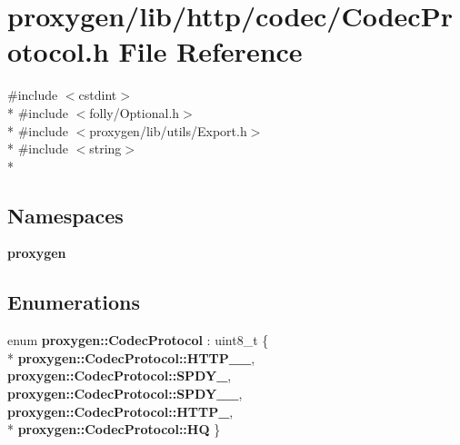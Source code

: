 \section{proxygen/lib/http/codec/\+Codec\+Protocol.h File Reference}
\label{CodecProtocol_8h}
{\ttfamily \#include $<$cstdint$>$}\\*
{\ttfamily \#include $<$folly/\+Optional.\+h$>$}\\*
{\ttfamily \#include $<$proxygen/lib/utils/\+Export.\+h$>$}\\*
{\ttfamily \#include $<$string$>$}\\*
\subsection*{Namespaces}
\begin{DoxyCompactItemize}
\item 
 {\bf proxygen}
\end{DoxyCompactItemize}
\subsection*{Enumerations}
\begin{DoxyCompactItemize}
\item 
enum {\bf proxygen\+::\+Codec\+Protocol} \+: uint8\+\_\+t \{ \\*
{\bf proxygen\+::\+Codec\+Protocol\+::\+H\+T\+T\+P\+\_\+\_}, 
{\bf proxygen\+::\+Codec\+Protocol\+::\+S\+P\+D\+Y\+\_}, 
{\bf proxygen\+::\+Codec\+Protocol\+::\+S\+P\+D\+Y\+\_\+\_}, 
{\bf proxygen\+::\+Codec\+Protocol\+::\+H\+T\+T\+P\+\_}, 
\\*
{\bf proxygen\+::\+Codec\+Protocol\+::\+HQ}
 \}
\end{DoxyCompactItemize}
